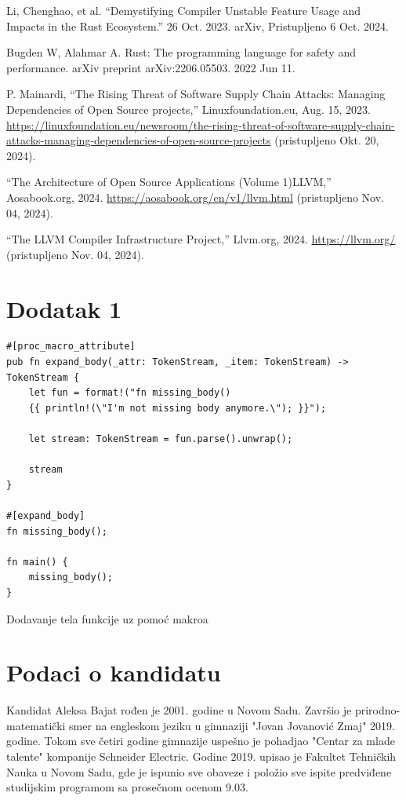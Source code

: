 \documentclass[11pt]{article}
\begin{document}
\begin{thebibliography}
    Li, Chenghao, et al. “Demystifying Compiler Unstable Feature Usage and Impacts in the Rust Ecosystem.” 26 Oct. 2023. arXiv, Pristupljeno 6 Oct. 2024. 

    Bugden W, Alahmar A. Rust: The programming language for safety and performance. arXiv preprint arXiv:2206.05503. 2022 Jun 11.

    P. Mainardi, “The Rising Threat of Software Supply Chain Attacks: Managing Dependencies of Open Source projects,” Linuxfoundation.eu, Aug. 15, 2023.
    \url{https://linuxfoundation.eu/newsroom/the-rising-threat-of-software-supply-chain-attacks-managing-dependencies-of-open-source-projects} (pristupljeno Okt. 20, 2024).

    “The Architecture of Open Source Applications (Volume 1)LLVM,” Aosabook.org, 2024. 
    \url{https://aosabook.org/en/v1/llvm.html} (pristupljeno Nov. 04, 2024).

    “The LLVM Compiler Infrastructure Project,” Llvm.org, 2024. 
    \url{https://llvm.org/} (pristupljeno Nov. 04, 2024).
\end{thebibliography}

\newpage
\section{Dodatak 1}

\begin{listing}[H]
\begin{verbatim}
#[proc_macro_attribute]
pub fn expand_body(_attr: TokenStream, _item: TokenStream) -> TokenStream {
    let fun = format!("fn missing_body() 
    {{ println!(\"I'm not missing body anymore.\"); }}");

    let stream: TokenStream = fun.parse().unwrap();

    stream
}

#[expand_body]
fn missing_body();

fn main() {
    missing_body();
}
\end{verbatim}
\caption{Dodavanje tela funkcije uz pomoć makroa}
\label{lst:bonus_body_expand}
\end{listing}


\newpage
\section{Podaci o kandidatu}


Kandidat Aleksa Bajat rođen je 2001. godine u Novom Sadu. Završio je prirodno-matematički smer na engleskom jeziku 
u gimnaziji "Jovan Jovanović Zmaj" 2019. godine. Tokom sve četiri godine gimnazije uspešno je pohadjao 
"Centar za mlade talente" kompanije Schneider Electric.  Godine 2019. upisao je Fakultet 
Tehničkih Nauka u Novom Sadu, gde je ispunio sve obaveze i položio sve ispite predviđene 
studijskim programom sa prosečnom ocenom 9.03.
\end{document}
